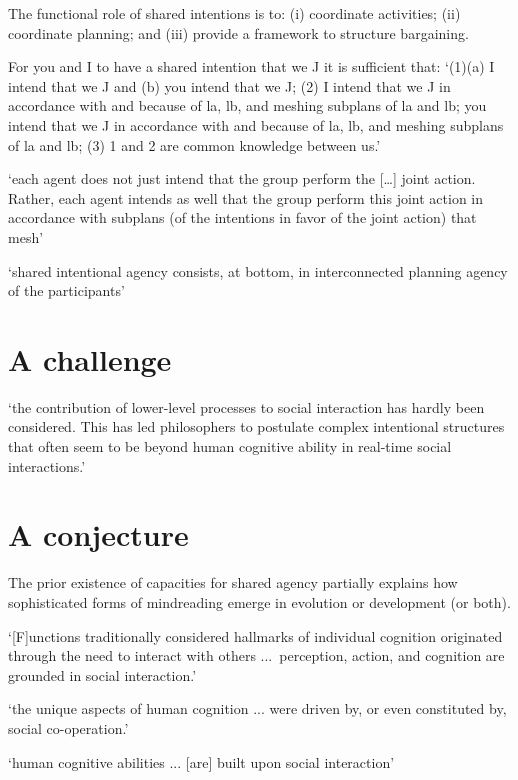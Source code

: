 \documentclass[11pt]{extarticle}
\begin{document}
\begin{multicols}{3}
The functional role of shared intentions is to: 
(i) coordinate activities; (ii) coordinate planning; and (iii) provide a framework to structure bargaining.\citep%
{Bratman:1993je}

For you and I to have a shared intention that we J it is sufficient that: `(1)(a) I intend that we J and (b) you intend that we J; (2) I intend that we J in accordance with and because of la, lb, and meshing subplans of la and lb; you intend that we J in accordance with and because of la, lb, and meshing subplans of la and lb; (3) 1 and 2 are common knowledge between us.'\citep%
{Bratman:1993je}


`each agent does not just intend that the group perform the […] joint action. Rather, each agent intends as well that the group perform this joint action in accordance with subplans (of the intentions in favor of the joint action) that mesh'\citep%
{Bratman:1992mi}

`shared intentional agency consists, at bottom, in interconnected planning agency of the participants'\citep{Bratman:2011fk} %


\section{A challenge}
`the contribution of lower-level processes to social interaction has hardly been considered. This has led philosophers to postulate complex intentional structures that often seem to be beyond human cognitive ability in real-time social interactions.'\citep{Knoblich:2008hy} %

\section{A conjecture}
The prior existence of capacities for shared agency partially explains how sophisticated forms of mindreading emerge in evolution or development (or both).

`[F]unctions traditionally considered hallmarks of individual cognition originated through the need to interact with others ...\
perception, action, and cognition are grounded in social interaction.'\citep{Knoblich:2006bn} %

`the unique aspects of human cognition ... were driven by, or even constituted by, social co-operation.'\citep{Moll:2007gu} %

`human cognitive abilities ... [are] built upon social interaction' 






\end{multicols}
\end{document}
